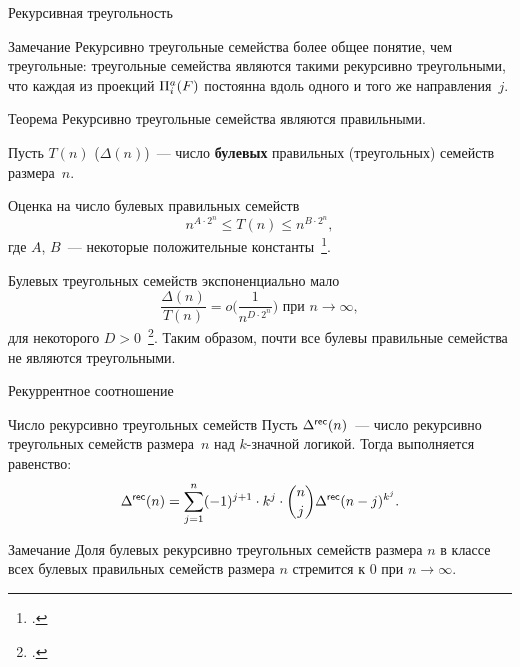 \begin{frame}{Рекурсивная треугольность}
    \begin{mytheorem}{Замечание}
        Рекурсивно треугольные семейства более общее понятие, чем треугольные: треугольные семейства являются такими рекурсивно треугольными, что каждая из проекций $\Pi^a_i(F)$ постоянна вдоль одного и того же направления~$j$.
    \end{mytheorem}
    \pause
    \begin{mytheorem}{Теорема}
        Рекурсивно треугольные семейства являются правильными.
    \end{mytheorem}
\end{frame}


\begin{frame}%
    Пусть $T(n)$ ($\Delta(n)$)~--- число \textbf{булевых} правильных (треугольных) семейств размера~$n$.
    \pause
    \begin{mypropos}{Оценка на число булевых правильных семейств}
        \[
            n^{A \cdot 2^n} \le T(n) \le n^{B \cdot 2^n},
        \]
        где $A$, $B$~--- некоторые положительные константы~\footcite{numberUSO}.
    \end{mypropos}
    \pause 
    \begin{mytheorem}{Булевых треугольных семейств экспоненциально мало}
    \label{ThTri}
        \[
            \frac{\Delta(n)}{T(n)} = o \Big(\frac{1}{n^{D \cdot 2^n}} \Big) \text{ при } n \to \infty,
        \]
        для некоторого $D > 0$~\footcite{dm21}.
        Таким образом, почти все булевы правильные семейства не являются треугольными.
    \end{mytheorem}
\end{frame}


\begin{frame}{Рекуррентное соотношение}
    \begin{mytheorem}{Число рекурсивно треугольных семейств}
        Пусть $\Delta^{\mathsf{rec}}(n)$~--- число рекурсивно треугольных семейств размера~$n$ над $k$-значной логикой.
        Тогда выполняется равенство:
        \[
            \Delta^{\mathsf{rec}}(n) = \sum_{j=1}^{n} (-1)^{j+1} \cdot k^j \cdot {n \choose j} \Delta^{\mathsf{rec}}(n-j)^{k^j}.
        \]
    \end{mytheorem}
    \pause 
    \begin{mytheorem}{Замечание}
        Доля булевых рекурсивно треугольных семейств размера $n$ в классе всех булевых правильных семейств размера $n$ стремится к 0 при $n \to \infty$. 
    \end{mytheorem}
\end{frame}


